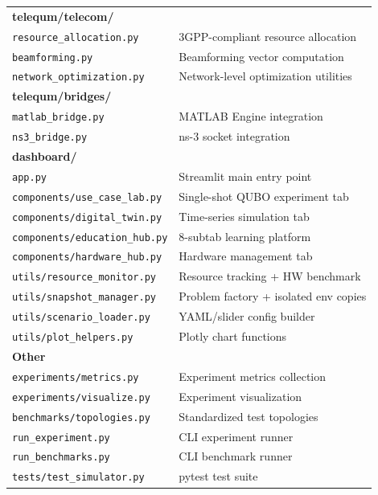 \documentclass[11pt,a4paper]{article}
\begin{document}
\begin{longtable}{lp{8cm}}
\multicolumn{2}{l}{\textbf{telequm/telecom/}} \\
\texttt{resource\_allocation.py} & 3GPP-compliant resource allocation \\
\texttt{beamforming.py} & Beamforming vector computation \\
\texttt{network\_optimization.py} & Network-level optimization utilities \\
\midrule

\multicolumn{2}{l}{\textbf{telequm/bridges/}} \\
\texttt{matlab\_bridge.py} & MATLAB Engine integration \\
\texttt{ns3\_bridge.py} & ns-3 socket integration \\
\midrule

\multicolumn{2}{l}{\textbf{dashboard/}} \\
\texttt{app.py} & Streamlit main entry point \\
\texttt{components/use\_case\_lab.py} & Single-shot QUBO experiment tab \\
\texttt{components/digital\_twin.py} & Time-series simulation tab \\
\texttt{components/education\_hub.py} & 8-subtab learning platform \\
\texttt{components/hardware\_hub.py} & Hardware management tab \\
\texttt{utils/resource\_monitor.py} & Resource tracking + HW benchmark \\
\texttt{utils/snapshot\_manager.py} & Problem factory + isolated env copies \\
\texttt{utils/scenario\_loader.py} & YAML/slider config builder \\
\texttt{utils/plot\_helpers.py} & Plotly chart functions \\
\midrule

\multicolumn{2}{l}{\textbf{Other}} \\
\texttt{experiments/metrics.py} & Experiment metrics collection \\
\texttt{experiments/visualize.py} & Experiment visualization \\
\texttt{benchmarks/topologies.py} & Standardized test topologies \\
\texttt{run\_experiment.py} & CLI experiment runner \\
\texttt{run\_benchmarks.py} & CLI benchmark runner \\
\texttt{tests/test\_simulator.py} & pytest test suite \\
\bottomrule
\end{longtable}
\end{document}
